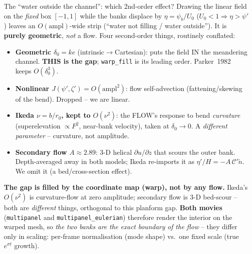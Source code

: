 \documentclass[aspectratio=169,10pt]{beamer}
\newcommand{\hl}[2]{\textcolor{#1}{\textbf{#2}}}
\newcommand{\pp}{\psi'}
\newcommand{\zp}{\zeta'}
\begin{document}
\begin{frame}{The ``water outside the channel'': which 2nd-order effect?}
Drawing the linear field on the \emph{fixed} box $[-1,1]$ while the banks displace by
$\eta=\psi_b/U_0$ ($U_0<1\Rightarrow\eta>\pp$) leaves an $O(\text{ampl})$-wide strip
(``water not filling / water outside'').  It is \hl{cCurv}{purely geometric}, \emph{not} a
flow.  Four second-order things, routinely conflated:
\begin{itemize}\footnotesize
  \item \hl{cCurv}{Geometric $\delta_0=ke$} (intrinsic$\to$Cartesian): puts the field IN the
  meandering channel. \hl{cGrowth}{THIS is the gap}; \texttt{warp\_fill} is its leading order.
  Parker~1982 keeps $O(\delta_0^3)$.
  \item \hl{cMom}{Nonlinear $J(\pp,\zp)=O(\text{ampl}^2)$}: flow self-advection
  (fattening/skewing of the bend).  Dropped -- we are linear.
  \item \hl{cVeloc}{Ikeda $\nu=b/r_0$, kept to $O(\nu^2)$}: the FLOW's response to bend
  \emph{curvature} (superelevation $\propto F^2$, near-bank velocity), taken at
  $\delta_0\to0$.  A \emph{different parameter} -- curvature, not amplitude.
  \item \hl{cBank}{Secondary flow $A\approx2.89$}: 3-D helical $\partial u/\partial z$ that
  scours the outer bank.  Depth-averaged away in both models; Ikeda re-imports it as
  $\eta'/H=-A\,\mathscr C'\tilde n$.  We omit it (a bed/cross-section effect).
\end{itemize}
\hl{cEros}{The gap is filled by the coordinate map (warp), not by any flow.}  Ikeda's
$O(\nu^2)$ is curvature-flow at zero amplitude; secondary flow is 3-D bed-scour -- both are
\emph{different} things, orthogonal to this planform gap.  \hl{cChannel}{Both movies}
(\texttt{multipanel} and \texttt{multipanel\_eulerian}) therefore render the interior on the
warped mesh, so \emph{the two banks are the exact boundary of the flow} -- they differ only in
scaling: per-frame normalisation (mode shape) vs.\ one fixed scale (true $e^{\sigma t}$ growth).
\end{frame}
\end{document}

